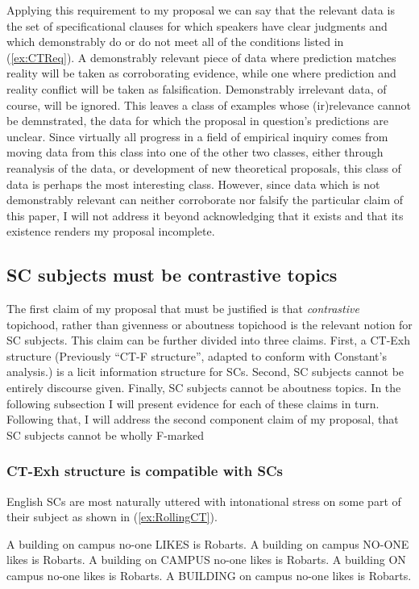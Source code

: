 \documentclass[
]{RCL}
\begin{document}
Applying this requirement to my proposal we can say that the relevant data is the set of specificational clauses for which speakers have clear judgments and which demonstrably do or do not meet all of the conditions listed in (\ref{ex:CTReq}).
A demonstrably relevant piece of data where prediction matches reality will be taken as corroborating evidence, while one where prediction and reality conflict will be taken as falsification.
Demonstrably irrelevant data, of course, will be ignored.
This leaves a class of examples whose (ir)relevance cannot be demnstrated, the data for which the proposal in question's predictions are unclear.
Since virtually all progress in a field of empirical inquiry comes from moving data from this class into one of the other two classes, either through reanalysis of the data, or development of new theoretical proposals, this class of data is perhaps the most interesting class.
However, since data which is not demonstrably relevant can neither corroborate nor falsify the particular claim of this paper, I will not address it beyond acknowledging that it exists and that its existence renders my proposal incomplete.

\subsection{SC subjects must be contrastive topics}
The first claim of my proposal that must be justified is that \textit{contrastive} topichood, rather than givenness or aboutness topichood is the relevant notion for SC subjects.
This claim can be further divided into three claims.
First, a CT-Exh structure (Previously ``CT-F structure'', adapted to conform with Constant's analysis.) is a licit information structure for SCs.
Second, SC subjects cannot be entirely discourse given.
Finally, SC subjects cannot be aboutness topics.
In the following subsection I will present evidence for each of these claims in turn.
Following that, I will address the second component claim of my proposal, that SC subjects cannot be wholly F-marked
\subsubsection{CT-Exh structure is compatible with SCs}\label{sec:CanBeCTs}
English SCs are most naturally uttered with intonational stress on some part of their subject as shown in (\ref{ex:RollingCT}).
\begin{exe}
	\ex\label{ex:RollingCT}
	\begin{xlist}
		\ex A building on campus no-one LIKES is Robarts.
		\ex A building on campus NO-ONE likes is Robarts.
		\ex A building on CAMPUS no-one likes is Robarts.
		\ex A building ON campus no-one likes is Robarts.
		\ex A BUILDING on campus no-one likes is Robarts.
	\end{xlist}
\end{exe}
\end{document}
